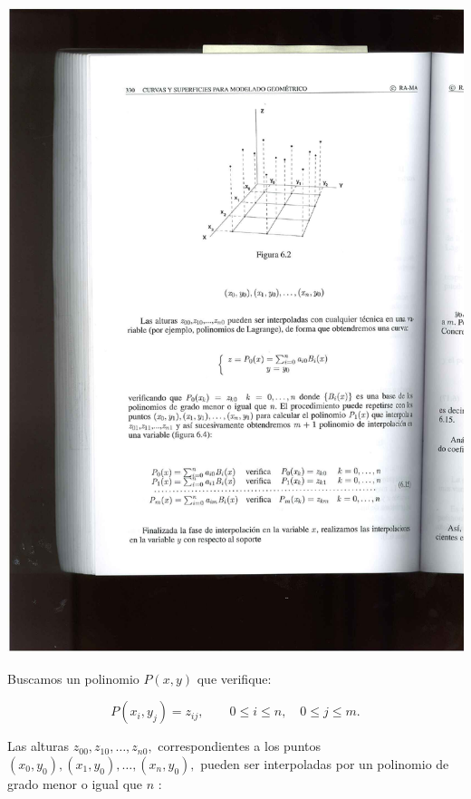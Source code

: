 \documentclass[ebook,oneside]{memoir}
\begin{document}
\begin{center}
\includegraphics[scale=0.55]{6_2.pdf}
\end{center}

Buscamos un polinomio $P(x,y)$ que verifique:

$$P(x_i,y_j)=z_{ij},\quad \quad 0\leq i\leq n,\quad 0\leq j\leq
m.$$

Las alturas $z_{00},z_{10},\ldots,z_{n0},$ correspondientes a los puntos $(x_0,y_0),(x_1,y_0),\ldots,(x_n,y_0),$ pueden ser interpoladas por un polinomio de grado menor o igual que $n$ :
\end{document}
